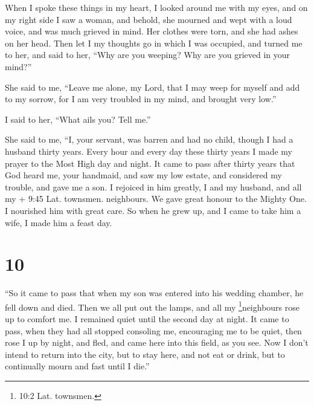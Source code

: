  When I spoke these things in my heart, I looked around me
with my eyes, and on my right side I saw a woman, and behold, she
mourned and wept with a loud voice, and was much grieved in mind. Her
clothes were torn, and she had ashes on her head.  Then let
I my thoughts go in which I was occupied, and turned me to her,
 and said to her, ``Why are you weeping? Why are you
grieved in your mind?''

 She said to me, ``Leave me alone, my Lord, that I may weep
for myself and add to my sorrow, for I am very troubled in my mind, and
brought very low.''

 I said to her, ``What ails you? Tell me.''

 She said to me, ``I, your servant, was barren and had no
child, though I had a husband thirty years.  Every hour and
every day these thirty years I made my prayer to the Most High day and
night.  It came to pass after thirty years that God heard
me, your handmaid, and saw my low estate, and considered my trouble, and
gave me a son. I rejoiced in him greatly, I and my husband, and all my +
9:45 Lat. townsmen. neighbours. We gave great honour to the Mighty One.
 I nourished him with great care.  So when he
grew up, and I came to take him a wife, I made him a feast day.

\hypertarget{section-9}{%
\section{10}\label{section-9}}

 ``So it came to pass that when my son was entered into his
wedding chamber, he fell down and died.  Then we all put out
the lamps, and all my \footnote{10:2 Lat. townsmen.}neighbours rose up
to comfort me. I remained quiet until the second day at night.
 It came to pass, when they had all stopped consoling me,
encouraging me to be quiet, then rose I up by night, and fled, and came
here into this field, as you see.  Now I don't intend to
return into the city, but to stay here, and not eat or drink, but to
continually mourn and fast until I die.''

